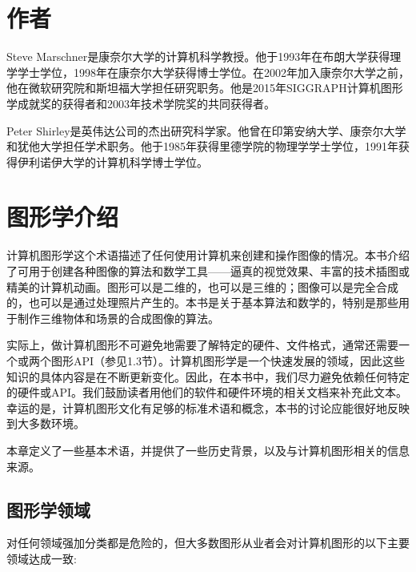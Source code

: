 \documentclass[lang=cn,12pt]{elegantbook}
\begin{document}



\chapter{作者}

Steve Marschner是康奈尔大学的计算机科学教授。他于1993年在布朗大学获得理学学士学位，1998年在康奈尔大学获得博士学位。在2002年加入康奈尔大学之前，他在微软研究院和斯坦福大学担任研究职务。他是2015年SIGGRAPH计算机图形学成就奖的获得者和2003年技术学院奖的共同获得者。

Peter Shirley是英伟达公司的杰出研究科学家。他曾在印第安纳大学、康奈尔大学和犹他大学担任学术职务。他于1985年获得里德学院的物理学学士学位，1991年获得伊利诺伊大学的计算机科学博士学位。

\tableofcontents

\mainmatter

\chapter{图形学介绍}

计算机图形学这个术语描述了任何使用计算机来创建和操作图像的情况。本书介绍了可用于创建各种图像的算法和数学工具——逼真的视觉效果、丰富的技术插图或精美的计算机动画。图形可以是二维的，也可以是三维的；图像可以是完全合成的，也可以是通过处理照片产生的。本书是关于基本算法和数学的，特别是那些用于制作三维物体和场景的合成图像的算法。

实际上，做计算机图形不可避免地需要了解特定的硬件、文件格式，通常还需要一个或两个图形API（参见1.3节）。计算机图形学是一个快速发展的领域，因此这些知识的具体内容是在不断更新变化。因此，在本书中，我们尽力避免依赖任何特定的硬件或API。我们鼓励读者用他们的软件和硬件环境的相关文档来补充此文本。幸运的是，计算机图形文化有足够的标准术语和概念，本书的讨论应能很好地反映到大多数环境。



本章定义了一些基本术语，并提供了一些历史背景，以及与计算机图形相关的信息来源。

\section{图形学领域}

对任何领域强加分类都是危险的，但大多数图形从业者会对计算机图形的以下主要领域达成一致:
\end{document}
